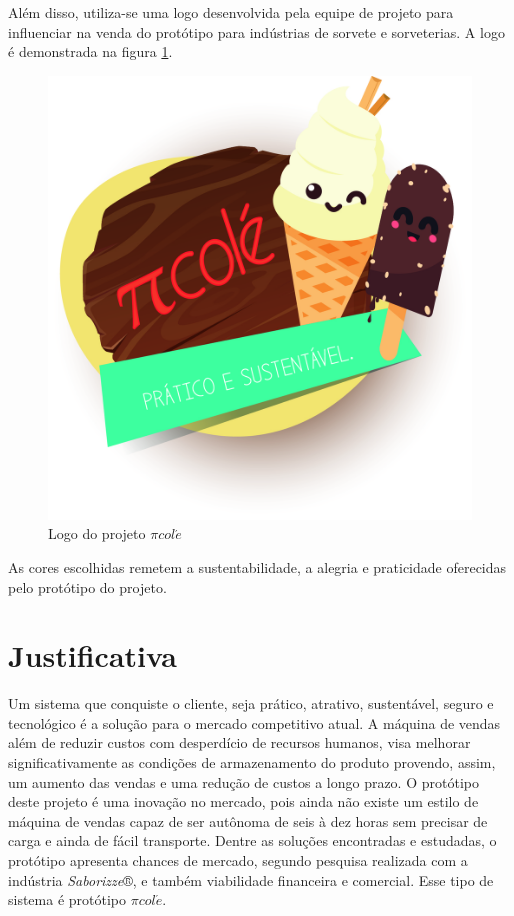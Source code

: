 Além disso, utiliza-se uma logo desenvolvida pela equipe de projeto para influenciar na venda do protótipo para indústrias de sorvete e sorveterias. A logo é demonstrada na figura \ref{fig:logopicole}.

\begin{figure}[H]
	\centering
    \includegraphics[scale=0.2]{figuras/logo_picole}
    \caption{Logo do projeto $\pi col\acute{e}$}
    \label{fig:logopicole}
\end{figure}

As cores escolhidas remetem a sustentabilidade, a alegria e praticidade oferecidas pelo protótipo do projeto. 

\section{Justificativa}

Um sistema que conquiste o cliente, seja prático, atrativo, sustentável, seguro e tecnológico é a solução para o mercado competitivo atual.
A máquina de vendas além de reduzir custos com desperdício de recursos humanos, visa melhorar significativamente as condições de armazenamento do produto provendo, assim, um aumento das vendas e uma redução de custos a longo prazo.
O protótipo deste projeto é uma inovação no mercado, pois ainda não existe um estilo de máquina de vendas capaz de ser autônoma de seis à dez horas sem precisar de carga e ainda de fácil transporte. 
Dentre as soluções encontradas e estudadas, o protótipo apresenta chances de mercado, segundo pesquisa realizada com a indústria \textit{ Saborizze}®, e também viabilidade financeira e comercial.
Esse tipo de sistema é protótipo $\pi col\acute{e}$.  

